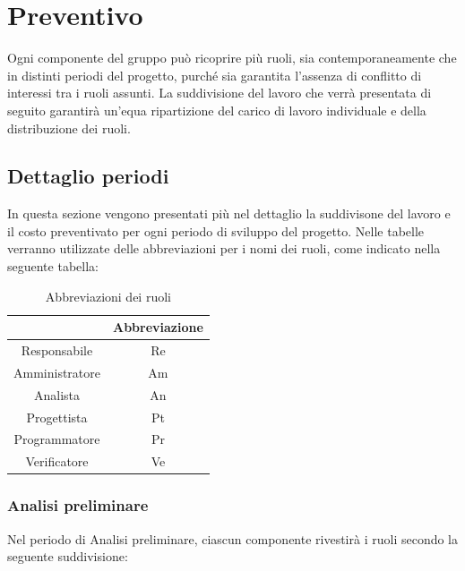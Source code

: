 \section{Preventivo} \label{section:preventivo}
Ogni componente del gruppo può ricoprire più ruoli, sia contemporaneamente che in distinti periodi del progetto, purché sia garantita l'assenza di conflitto di interessi tra i ruoli assunti.
La suddivisione del lavoro che verrà presentata di seguito garantirà un'equa ripartizione del carico di lavoro individuale e della distribuzione dei ruoli.
\subsection{Dettaglio periodi} \label{subsection:preventivo_dettaglio_periodi}
In questa sezione vengono presentati più nel dettaglio la suddivisone del lavoro e il costo preventivato per ogni periodo di sviluppo del progetto. Nelle tabelle
verranno utilizzate delle abbreviazioni per i nomi dei ruoli, come indicato nella seguente tabella:

\begin{table}[H]
    \centering
    \renewcommand{\arraystretch}{1.8}
    \begin{tabular}{c|c}
      \rowcolor[HTML]{125E28} 
      \multicolumn{1}{c}{\color[HTML]{FFFFFF}\textbf{Ruolo}}
      & \multicolumn{1}{c}{\color[HTML]{FFFFFF}\textbf{Abbreviazione}}\\
      \hline
      Responsabile      & Re\\
      Amministratore    & Am\\
      Analista          & An\\
      Progettista       & Pt\\
      Programmatore     & Pr\\
      Verificatore      & Ve
    \end{tabular}
    \caption{Abbreviazioni dei ruoli}
  \end{table}

\pagebreak
\subsubsection{Analisi preliminare}
Nel periodo di Analisi preliminare, ciascun componente rivestirà i ruoli secondo la seguente suddivisione:

